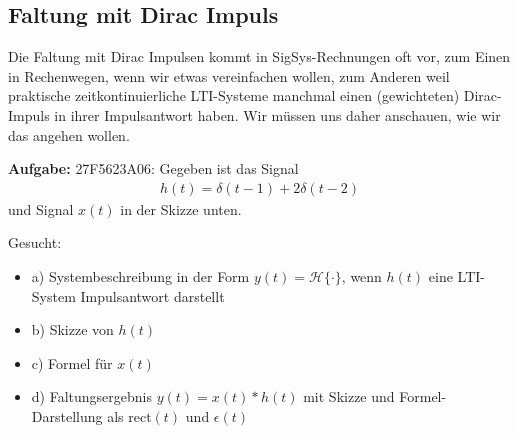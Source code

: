 \newpage
\subsection{Faltung mit Dirac Impuls}
\label{sec:27F5623A06}
\begin{Ziel}
Die Faltung mit Dirac Impulsen kommt in SigSys-Rechnungen oft vor, zum Einen
in Rechenwegen, wenn wir etwas vereinfachen wollen, zum Anderen weil praktische
zeitkontinuierliche LTI-Systeme manchmal einen (gewichteten) Dirac-Impuls
in ihrer Impulsantwort haben.
%
Wir müssen uns daher anschauen, wie wir das angehen wollen.
\end{Ziel}
\textbf{Aufgabe:}  {\tiny 27F5623A06}: Gegeben ist das Signal
\begin{align*}
h(t) = \delta(t-1) + 2\delta(t-2)
\end{align*}
und Signal $x(t)$ in der Skizze unten.
\begin{figure}[h!]
\centering
\begin{subfigure}{0.4\textwidth}
\end{subfigure}
\end{figure}

Gesucht:
\begin{itemize}
\setlength\itemsep{-0.5em}
\item a) Systembeschreibung in der Form $y(t) = \mathcal{H}\{\cdot\}$, wenn $h(t)$ eine LTI-System Impulsantwort darstellt
\item b) Skizze von $h(t)$
\item c) Formel für $x(t)$
\item d) Faltungsergebnis $y(t) = x(t) \ast h(t)$ mit Skizze und Formel-Darstellung als $\text{rect}(t)$ und $\epsilon(t)$
\end{itemize}



